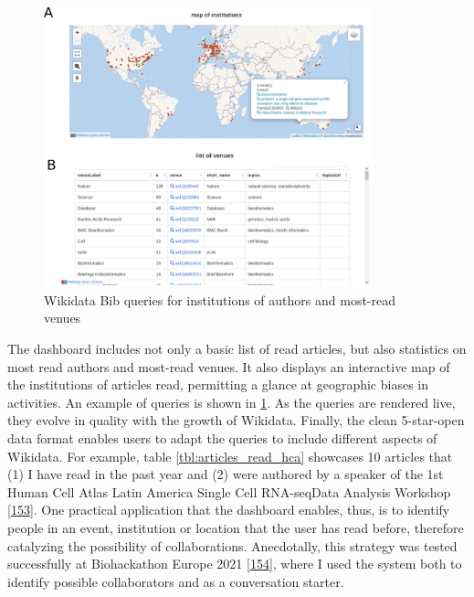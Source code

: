 \begin{figure}
\hypertarget{fig:dashboard}{%
\centering
\includegraphics[width=0.85\textwidth,height=\textheight]{images/wikidata_bib_display.png}
\caption{Wikidata Bib queries for institutions of authors and most-read venues}\label{fig:dashboard}
}
\end{figure}

The dashboard includes not only a basic list of read articles, but also statistics on most read authors and most-read venues.
It also displays an interactive map of the institutions of articles read, permitting a glance at geographic biases in activities.
An example of queries is shown in \ref{fig:dashboard}.
As the queries are rendered live, they evolve in quality with the growth of Wikidata.
Finally, the clean 5-star-open data format enables users to adapt the queries to include different aspects of Wikidata.
For example, table \ref{tbl:articles_read_hca} showcases 10 articles that (1) I have read in the past year and (2) were authored by a speaker of the 1st Human Cell Atlas Latin America Single Cell RNA-seqData Analysis Workshop {[}\protect\hyperlink{ref-1hag8XE6}{153}{]}.
One practical application that the dashboard enables, thus, is to identify people in an event, institution or location that the user has read before, therefore catalyzing the possibility of collaborations.
Anecdotally, this strategy was tested successfully at Biohackathon Europe 2021 {[}\protect\hyperlink{ref-kHL3NVxk}{154}{]}, where I used the system both to identify possible collaborators and as a conversation starter.

